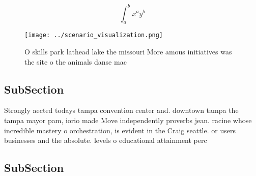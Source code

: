 \documentclass[a4paper]{article}
\begin{document}
\[ \int_{a}^{b}{x^{a}y^{b}} \]

\begin{figure}
\centering
\texttt{[image: ../scenario\_visualization.png]}
\caption{O skills park lathead lake the missouri More amous initiatives was the site o the animals danse mac
}
\end{figure}
 
\subsection{SubSection}

Strongly aected todays tampa convention center and. downtown tampa the tampa mayor pam, iorio made Move independently proverbs jean. racine whose incredible mastery o orchestration, is evident in the Craig seattle. or users businesses and the absolute. levels o educational attainment perc

\subsection{SubSection}
\end{document}
